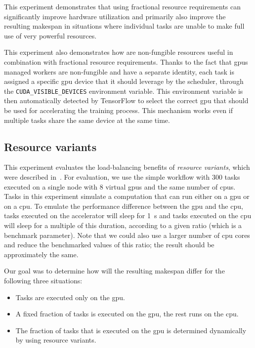 This experiment demonstrates that using fractional resource requirements can significantly
improve hardware utilization and primarily also improve the resulting makespan in
situations where individual tasks are unable to make full use of very powerful resources.

This experiment also demonstrates how are non-fungible resources useful in combination with
fractional resource requirements. Thanks to the fact that \glspl{gpu} managed \hyperqueue{} workers
are non-fungible and have a separate identity, each task is assigned a specific \gls{gpu}
device that it should leverage by the scheduler, through the \texttt{CUDA\_VISIBLE\_DEVICES}
environment variable. This environment variable is then automatically detected by TensorFlow to
select the correct \gls{gpu} that should be used for accelerating the training process. This
mechanism works even if multiple tasks share the same device at the same time.

\subsection{Resource variants}
\label{sec:hq-exp-resource-variants}
This experiment evaluates the load-balancing benefits of \emph{resource variants}, which were
described in~. For evaluation, we use the simple workflow with
$300$ tasks executed on a single node with $8$ virtual
\glspl{gpu} and the same number of \glspl{cpu}. Tasks in this experiment
simulate a computation that can run either on a \gls{gpu} or on a
\gls{cpu}. To emulate the performance difference between the \gls{gpu}
and the \gls{cpu}, tasks executed on the accelerator will sleep for
\SI{1}{\second} and tasks executed on the \gls{cpu} will sleep for a
multiple of this duration, according to a given ratio (which is a benchmark parameter).
Note that we could also use a larger number of \gls{cpu} cores and reduce the benchmarked values
of this ratio; the result should be approximately the same.

Our goal was to determine how will the resulting makespan differ for the following three
situations:
\begin{itemize}[itemsep=0pt,topsep=2pt]
	\item Tasks are executed only on the \gls{gpu}.
	\item A fixed fraction of tasks is executed on the \gls{gpu}, the rest runs on the
	      \gls{cpu}.
	\item The fraction of tasks that is executed on the \gls{gpu} is determined dynamically by
	      \hyperqueue{} using resource variants.
\end{itemize}

